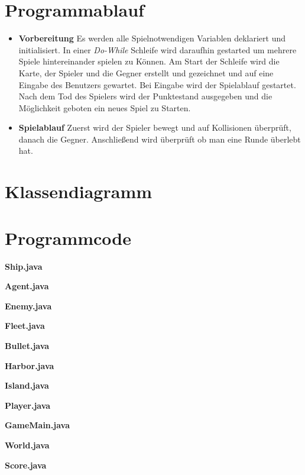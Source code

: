 \documentclass{article}
\begin{document}
\section{Programmablauf}
\begin{itemize}
    \item \textbf{Vorbereitung}
        \newline
        Es werden alle Spielnotwendigen Variablen deklariert und initialisiert. In einer \textit{Do-While} Schleife wird daraufhin gestarted um mehrere Spiele hintereinander spielen zu Können. Am Start der Schleife wird die Karte, der Spieler und die Gegner erstellt und gezeichnet und auf eine Eingabe des Benutzers gewartet. Bei Eingabe wird der Spielablauf gestartet. Nach dem Tod des Spielers wird der Punktestand ausgegeben und die Möglichkeit geboten ein neues Spiel zu Starten.
    \item \textbf{Spielablauf}
        \newline
        Zuerst wird der Spieler bewegt und auf Kollisionen überprüft, danach die Gegner. Anschließend wird überprüft ob man eine Runde überlebt hat.
\end{itemize}
\newpage

\section{Klassendiagramm}
\newpage
\section{Programmcode}
\textbf{Ship.java}

\newpage
\textbf{Agent.java}

\newpage
\textbf{Enemy.java}

\newpage
\textbf{Fleet.java}

\newpage
\textbf{Bullet.java}

\newpage
\textbf{Harbor.java}

\newpage
\textbf{Island.java}

\newpage
\textbf{Player.java}

\newpage
\textbf{GameMain.java}

\newpage
\textbf{World.java}

\newpage
\textbf{Score.java}

\end{document}
